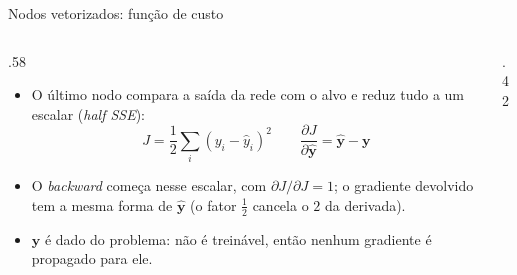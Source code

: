 \documentclass[aspectratio=169,xcolor=dvipsnames]{beamer}
\begin{document}
  \begin{frame}{Nodos vetorizados: função de custo}
    \begin{columns}
      \begin{column}{.58\linewidth}
        \begin{itemize}
          \item O último nodo compara a saída da rede com o alvo e
            reduz tudo a um escalar (\textit{half SSE}):
            \[
              J = \frac{1}{2}\sum_{i}\left(y_i - \hat{y}_i\right)^{2}
              \qquad
              \frac{\partial J}{\partial \hat{\mathbf{y}}} = \hat{\mathbf{y}} - \mathbf{y}
            \]
          \item O \textit{backward} começa nesse escalar, com
            $\partial J/\partial J = 1$; o gradiente devolvido tem a mesma
            forma de $\hat{\mathbf{y}}$ (o fator $\tfrac{1}{2}$ cancela o $2$ da
            derivada).
          \item $\mathbf{y}$ é dado do problema: não é treinável, então nenhum gradiente
            é propagado para ele.
        \end{itemize}
      \end{column}
      \begin{column}{.42\linewidth}
        \centering
      \end{column}
    \end{columns}
  \end{frame}
\end{document}

